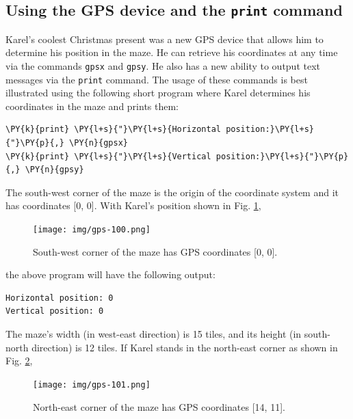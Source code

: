 \subsection[\ \ Using the GPS device and the {\tt print} command]{Using the GPS device and the {\tt print} command}

Karel's coolest Christmas present was a new GPS device that allows him to determine his position 
in the maze. He can retrieve his coordinates at any time via the 
commands {\tt gpsx} and {\tt gpsy}. He also has a new ability to output text messages via the {\tt print} 
command. The usage of these commands is best illustrated using the following short program where 
Karel determines his coordinates in the maze and prints them:\\

\begin{bbox}
\begin{Verbatim}[commandchars=\\\{\}]
\PY{k}{print} \PY{l+s}{"}\PY{l+s}{Horizontal position:}\PY{l+s}{"}\PY{p}{,} \PY{n}{gpsx}
\PY{k}{print} \PY{l+s}{"}\PY{l+s}{Vertical position:}\PY{l+s}{"}\PY{p}{,} \PY{n}{gpsy}
\end{Verbatim}
\end{bbox}
\vspace{6mm}

\noindent
The south-west corner of the maze is the origin of the coordinate system and it has 
coordinates [0, 0]. With Karel's position shown in Fig. \ref{fig:gps-100},
\newpage
\begin{figure}[!ht]
\begin{center}
\texttt{[image: img/gps-100.png]}
\vspace{-0mm}
\caption{South-west corner of the maze has GPS coordinates [0, 0].}
\vspace{-6mm}
\label{fig:gps-100}
\end{center}
\end{figure}
\noindent
the above program will have the following output:\\

\begin{ybox}
\begin{verbatim}
Horizontal position: 0
Vertical position: 0
\end{verbatim}
\end{ybox}
\vspace{6mm}

\noindent
The maze's width (in west-east direction) is 15 tiles, and its height (in south-north direction) 
is 12 tiles. If Karel stands in the north-east corner as shown in Fig. \ref{fig:gps-101},
\newpage
\begin{figure}[!ht]
\begin{center}
\texttt{[image: img/gps-101.png]}
\vspace{-0mm}
\caption{North-east corner of the maze has GPS coordinates [14, 11].}
\label{fig:gps-101}
\end{center}
\end{figure}


